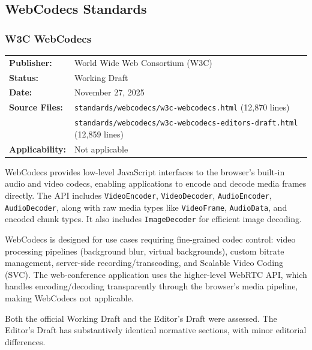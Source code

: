 \documentclass[11pt,letterpaper]{article}
\begin{document}
\subsection{WebCodecs Standards}
\label{app:webcodecs-standards}

\subsubsection{W3C WebCodecs}
\label{app:w3c-webcodecs}

\begin{tabular}{ll}
\textbf{Publisher:} & World Wide Web Consortium (W3C) \\
\textbf{Status:} & Working Draft \\
\textbf{Date:} & November 27, 2025 \\
\textbf{Source Files:} & \texttt{standards/webcodecs/w3c-webcodecs.html} (12,870 lines) \\
 & \texttt{standards/webcodecs/w3c-webcodecs-editors-draft.html} (12,859 lines) \\
\textbf{Applicability:} & Not applicable \\
\end{tabular}

\vspace{0.5em}
WebCodecs provides low-level JavaScript interfaces to the browser's built-in audio and video codecs, enabling applications to encode and decode media frames directly. The API includes \texttt{VideoEncoder}, \texttt{VideoDecoder}, \texttt{AudioEncoder}, \texttt{AudioDecoder}, along with raw media types like \texttt{VideoFrame}, \texttt{AudioData}, and encoded chunk types. It also includes \texttt{ImageDecoder} for efficient image decoding.

WebCodecs is designed for use cases requiring fine-grained codec control: video processing pipelines (background blur, virtual backgrounds), custom bitrate management, server-side recording/transcoding, and Scalable Video Coding (SVC). The web-conference application uses the higher-level WebRTC API, which handles encoding/decoding transparently through the browser's media pipeline, making WebCodecs not applicable.

Both the official Working Draft and the Editor's Draft were assessed. The Editor's Draft has substantively identical normative sections, with minor editorial differences.
\end{document}
